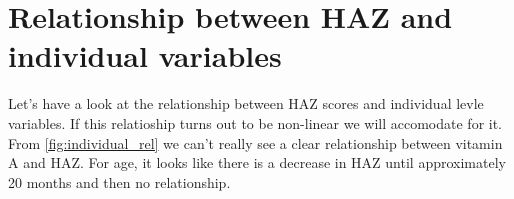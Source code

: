\documentclass[11pt,]{article}
\newenvironment{Shaded}{\begin{snugshade}}{\end{snugshade}}
\newcommand{\ControlFlowTok}[1]{\textcolor[rgb]{0.13,0.29,0.53}{\textbf{#1}}}
\newcommand{\DataTypeTok}[1]{\textcolor[rgb]{0.13,0.29,0.53}{#1}}
\newcommand{\DecValTok}[1]{\textcolor[rgb]{0.00,0.00,0.81}{#1}}
\newcommand{\FloatTok}[1]{\textcolor[rgb]{0.00,0.00,0.81}{#1}}
\newcommand{\KeywordTok}[1]{\textcolor[rgb]{0.13,0.29,0.53}{\textbf{#1}}}
\newcommand{\NormalTok}[1]{#1}
\newcommand{\OperatorTok}[1]{\textcolor[rgb]{0.81,0.36,0.00}{\textbf{#1}}}
\newcommand{\StringTok}[1]{\textcolor[rgb]{0.31,0.60,0.02}{#1}}
\begin{document}
\hypertarget{relationship-between-haz-and-individual-variables}{%
\section{Relationship between HAZ and individual
variables}\label{relationship-between-haz-and-individual-variables}}

Let's have a look at the relationship between HAZ scores and individual
levle variables. If this relatioship turns out to be non-linear we will
accomodate for it. From \autoref{fig:individual_rel} we can't really see
a clear relationship between vitamin A and HAZ. For age, it looks like
there is a decrease in HAZ until approximately 20 months and then no
relationship.

\begin{Shaded}
\end{Shaded}
\end{document}
